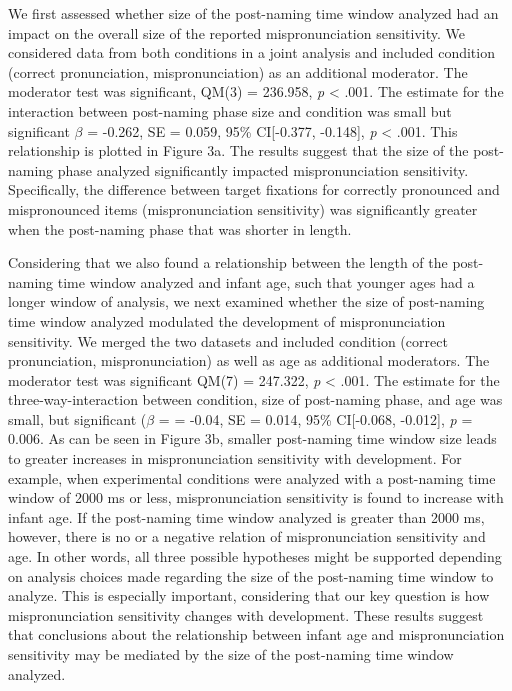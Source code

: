 \documentclass[man]{apa6}
\theoremstyle{definition}
\theoremstyle{definition}
\theoremstyle{definition}
\theoremstyle{remark}
\begin{document}
We first assessed whether size of the post-naming time window analyzed
had an impact on the overall size of the reported mispronunciation
sensitivity. We considered data from both conditions in a joint analysis
and included condition (correct pronunciation, mispronunciation) as an
additional moderator. The moderator test was significant, QM(3) =
236.958, \emph{p} \textless{} .001. The estimate for the interaction
between post-naming phase size and condition was small but significant
\(\beta\) = -0.262, SE = 0.059, 95\% CI{[}-0.377, -0.148{]}, \emph{p}
\textless{} .001. This relationship is plotted in Figure 3a. The results
suggest that the size of the post-naming phase analyzed significantly
impacted mispronunciation sensitivity. Specifically, the difference
between target fixations for correctly pronounced and mispronounced
items (mispronunciation sensitivity) was significantly greater when the
post-naming phase that was shorter in length.

Considering that we also found a relationship between the length of the
post-naming time window analyzed and infant age, such that younger ages
had a longer window of analysis, we next examined whether the size of
post-naming time window analyzed modulated the development of
mispronunciation sensitivity. We merged the two datasets and included
condition (correct pronunciation, mispronunciation) as well as age as
additional moderators. The moderator test was significant QM(7) =
247.322, \emph{p} \textless{} .001. The estimate for the
three-way-interaction between condition, size of post-naming phase, and
age was small, but significant (\(\beta\) = = -0.04, SE = 0.014, 95\%
CI{[}-0.068, -0.012{]}, \emph{p} = 0.006. As can be seen in Figure 3b,
smaller post-naming time window size leads to greater increases in
mispronunciation sensitivity with development. For example, when
experimental conditions were analyzed with a post-naming time window of
2000 ms or less, mispronunciation sensitivity is found to increase with
infant age. If the post-naming time window analyzed is greater than 2000
ms, however, there is no or a negative relation of mispronunciation
sensitivity and age. In other words, all three possible hypotheses might
be supported depending on analysis choices made regarding the size of
the post-naming time window to analyze. This is especially important,
considering that our key question is how mispronunciation sensitivity
changes with development. These results suggest that conclusions about
the relationship between infant age and mispronunciation sensitivity may
be mediated by the size of the post-naming time window analyzed.
\end{document}

